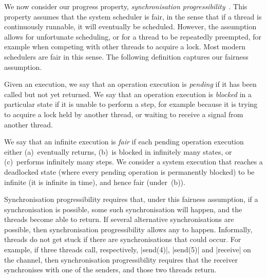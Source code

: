 
We now consider our progress property, \emph{synchronisation
  progressibility}~\cite{LL:synchronisation}.  This property assumes that the
system scheduler is fair, in the sense that if a thread is continuously
runnable, it will eventually be scheduled.  However, the assumption allows for
unfortunate scheduling, or for a thread to be repeatedly preempted, for
example when competing with other threads to acquire a lock.  Most modern
schedulers are fair in this sense.
The following definition captures our fairness assumption.
%
\begin{definition}
Given an execution, we say that an operation execution is \emph{pending} if it
has been called but not yet returned.  We say that an operation execution is
\emph{blocked} in a particular state if it is unable to perform a step, for
example because it is trying to acquire a lock held by another thread, or
waiting to receive a signal from another thread.

We say that an infinite execution is \emph{fair} if each pending operation
execution either (a)~eventually returns, (b)~is blocked in infinitely many
states, or (c)~performs infinitely many steps.  We consider a system execution
that reaches a deadlocked state (where every pending operation is permanently
blocked) to be infinite (it is infinite in time), and hence fair (under~(b)).
\end{definition}


Synchronisation progressibility requires that, under this fairness assumption,
if a synchronisation is possible, some such synchronisation will happen, and
the threads become able to return.  If several alternative synchronisations
are possible, then synchronisation progressibility allows any to happen.
Informally, threads do not get stuck if there are synchronisations that could
occur.  For example, if three threads call, respectively, |send(4)|, |send(5)|
and |receive| on the channel, then synchronisation progressibility requires
that the receiver synchronises with one of the senders, and those two threads
return.


